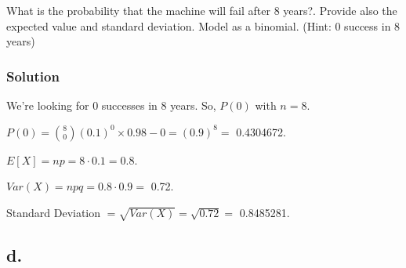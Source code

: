 \documentclass[]{article}
\newenvironment{Shaded}{\begin{snugshade}}{\end{snugshade}}
\newcommand{\KeywordTok}[1]{\textcolor[rgb]{0.13,0.29,0.53}{\textbf{#1}}}
\newcommand{\DecValTok}[1]{\textcolor[rgb]{0.00,0.00,0.81}{#1}}
\newcommand{\FloatTok}[1]{\textcolor[rgb]{0.00,0.00,0.81}{#1}}
\newcommand{\CharTok}[1]{\textcolor[rgb]{0.31,0.60,0.02}{#1}}
\newcommand{\StringTok}[1]{\textcolor[rgb]{0.31,0.60,0.02}{#1}}
\newcommand{\OperatorTok}[1]{\textcolor[rgb]{0.81,0.36,0.00}{\textbf{#1}}}
\newcommand{\NormalTok}[1]{#1}
\begin{document}
What is the probability that the machine will fail after 8 years?.
Provide also the expected value and standard deviation. Model as a
binomial. (Hint: 0 success in 8 years)

\subsubsection{Solution}\label{solution-3}

We're looking for 0 successes in 8 years. So, \(P(0)\) with \(n = 8\).

\(P(0) = \binom{8}{0}(0.1)^0 \times 0.9{8-0} = (0.9)^8 =\) 0.4304672.

\(E[X] = np = 8\cdot 0.1 = 0.8\).

\(Var(X) = npq = 0.8\cdot 0.9 =\) 0.72.

Standard Deviation \(= \sqrt{Var(X)} = \sqrt{0.72} =\) 0.8485281.

\begin{Shaded}
\end{Shaded}

\subsection{d.}\label{d.}
\end{document}
